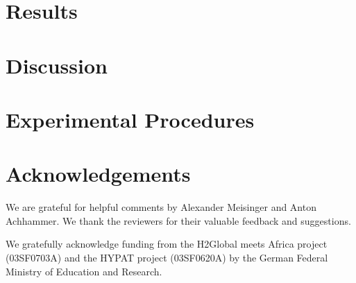 \documentclass[5p,numafflabel]{elsarticle}
\begin{document}
\section*{Results}
\label{sec:results}



\section*{Discussion}
\label{sec:discussion}



\label{sec:conclusion}



\section*{Experimental Procedures}
\label{sec:methods}










\section*{Acknowledgements}

We are grateful for helpful comments by Alexander Meisinger and Anton Achhammer.
We thank the reviewers for their valuable feedback and suggestions. 

We gratefully acknowledge funding from the H2Global meets Africa project (03SF0703A) and the HYPAT project (03SF0620A) by the German Federal Ministry of Education and Research.
\end{document}
